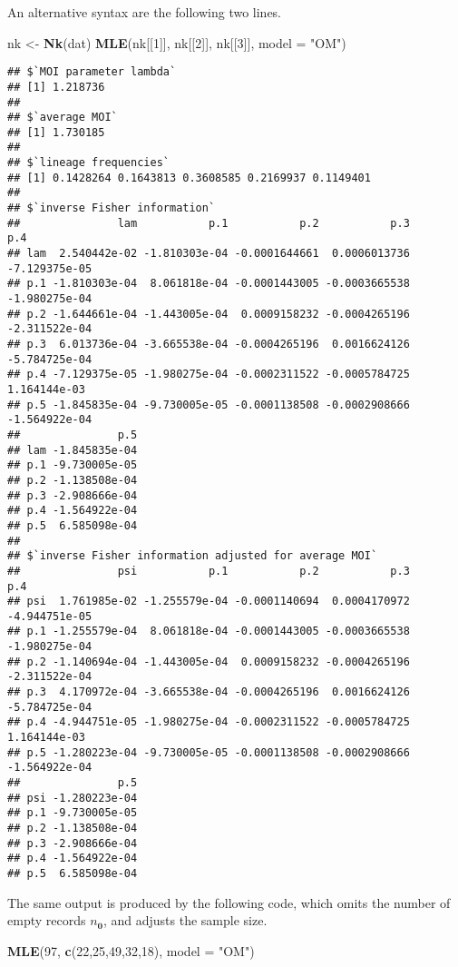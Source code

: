 \documentclass[
]{article}
\newenvironment{Shaded}{\begin{snugshade}}{\end{snugshade}}
\newcommand{\AttributeTok}[1]{\textcolor[rgb]{0.13,0.29,0.53}{#1}}
\newcommand{\DecValTok}[1]{\textcolor[rgb]{0.00,0.00,0.81}{#1}}
\newcommand{\FunctionTok}[1]{\textcolor[rgb]{0.13,0.29,0.53}{\textbf{#1}}}
\newcommand{\NormalTok}[1]{#1}
\newcommand{\OtherTok}[1]{\textcolor[rgb]{0.56,0.35,0.01}{#1}}
\newcommand{\StringTok}[1]{\textcolor[rgb]{0.31,0.60,0.02}{#1}}
\begin{document}
An alternative syntax are the following two lines.

\begin{Shaded}
\begin{Highlighting}[]
\NormalTok{nk }\OtherTok{\textless{}{-}} \FunctionTok{Nk}\NormalTok{(dat)}
\FunctionTok{MLE}\NormalTok{(nk[[}\DecValTok{1}\NormalTok{]], nk[[}\DecValTok{2}\NormalTok{]], nk[[}\DecValTok{3}\NormalTok{]], }\AttributeTok{model =} \StringTok{"OM"}\NormalTok{)}
\end{Highlighting}
\end{Shaded}

\begin{verbatim}
## $`MOI parameter lambda`
## [1] 1.218736
## 
## $`average MOI`
## [1] 1.730185
## 
## $`lineage frequencies`
## [1] 0.1428264 0.1643813 0.3608585 0.2169937 0.1149401
## 
## $`inverse Fisher information`
##               lam           p.1           p.2           p.3           p.4
## lam  2.540442e-02 -1.810303e-04 -0.0001644661  0.0006013736 -7.129375e-05
## p.1 -1.810303e-04  8.061818e-04 -0.0001443005 -0.0003665538 -1.980275e-04
## p.2 -1.644661e-04 -1.443005e-04  0.0009158232 -0.0004265196 -2.311522e-04
## p.3  6.013736e-04 -3.665538e-04 -0.0004265196  0.0016624126 -5.784725e-04
## p.4 -7.129375e-05 -1.980275e-04 -0.0002311522 -0.0005784725  1.164144e-03
## p.5 -1.845835e-04 -9.730005e-05 -0.0001138508 -0.0002908666 -1.564922e-04
##               p.5
## lam -1.845835e-04
## p.1 -9.730005e-05
## p.2 -1.138508e-04
## p.3 -2.908666e-04
## p.4 -1.564922e-04
## p.5  6.585098e-04
## 
## $`inverse Fisher information adjusted for average MOI`
##               psi           p.1           p.2           p.3           p.4
## psi  1.761985e-02 -1.255579e-04 -0.0001140694  0.0004170972 -4.944751e-05
## p.1 -1.255579e-04  8.061818e-04 -0.0001443005 -0.0003665538 -1.980275e-04
## p.2 -1.140694e-04 -1.443005e-04  0.0009158232 -0.0004265196 -2.311522e-04
## p.3  4.170972e-04 -3.665538e-04 -0.0004265196  0.0016624126 -5.784725e-04
## p.4 -4.944751e-05 -1.980275e-04 -0.0002311522 -0.0005784725  1.164144e-03
## p.5 -1.280223e-04 -9.730005e-05 -0.0001138508 -0.0002908666 -1.564922e-04
##               p.5
## psi -1.280223e-04
## p.1 -9.730005e-05
## p.2 -1.138508e-04
## p.3 -2.908666e-04
## p.4 -1.564922e-04
## p.5  6.585098e-04
\end{verbatim}

The same output is produced by the following code, which omits the
number of empty records \(n_{\pmb 0}\), and adjusts the sample size.

\begin{Shaded}
\begin{Highlighting}[]
\FunctionTok{MLE}\NormalTok{(}\DecValTok{97}\NormalTok{, }\FunctionTok{c}\NormalTok{(}\DecValTok{22}\NormalTok{,}\DecValTok{25}\NormalTok{,}\DecValTok{49}\NormalTok{,}\DecValTok{32}\NormalTok{,}\DecValTok{18}\NormalTok{), }\AttributeTok{model =} \StringTok{"OM"}\NormalTok{)}
\end{Highlighting}
\end{Shaded}
\end{document}
